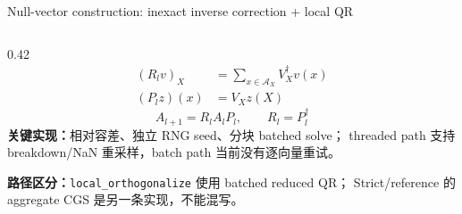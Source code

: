 \documentclass[UTF8,aspectratio=169,11pt,fontset=none]{ctexbeamer}
\newcommand{\code}[1]{\nolinkurl{#1}}
\begin{document}
\begin{frame}[t,shrink=5]{Null-vector construction: inexact inverse correction + local QR}
\begin{columns}[T,totalwidth=\textwidth]
\begin{column}{0.42\textwidth}
  \begin{equation}\tag{11}
  \begin{aligned}
  (R_lv)_X&=\sum_{x\in\mathcal A_X}V_X^\dagger v(x)\\
  (P_lz)(x)&=V_Xz(X)
  \end{aligned}
  \end{equation}
  \begin{equation}\tag{12}
  A_{l+1}=R_lA_lP_l,\qquad R_l=P_l^\dagger
  \end{equation}
  \small
  \textbf{关键实现：}相对容差、独立 RNG seed、分块 batched solve；
  threaded path 支持 breakdown/NaN 重采样，batch path 当前没有逐向量重试。
  \par\vspace{0.15em}
  \textbf{路径区分：}\code{local\_orthogonalize} 使用 batched reduced QR；
  Strict/reference 的 aggregate CGS 是另一条实现，不能混写。
\end{column}
\end{columns}
\end{frame}
\end{document}
